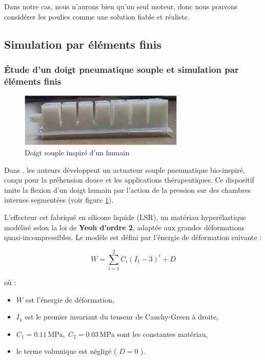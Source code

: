 \documentclass[a4paper, 11pt]{report}
\begin{document}
            Dans notre cas, nous n'aurons bien qu'un seul moteur, donc nous pouvons considérer les poulies comme une solution fiable et réaliste.

    \subsection{Simulation par éléments finis}

        \subsubsection{Étude d'un doigt pneumatique souple et simulation par éléments finis}

            \begin{figure}
                \centering
                \includegraphics[width=0.7\textwidth]{Figures/doigt_souple.jpg}
                \caption{Doigt souple inspiré d'un humain \cite{bhat_numerical_2025}}
                \label{fig:doigt_souple}
            \end{figure}

            Dans \cite{bhat_numerical_2025}, les auteurs développent un actuateur souple pneumatique bio-inspiré, conçu pour la préhension douce et les applications thérapeutiques. Ce dispositif imite la flexion d’un doigt humain par l'action de la pression sur des chambres internes segmentées (voir figure \ref{fig:doigt_souple}).

            L'effecteur est fabriqué en silicone liquide (LSR), un matériau hyperélastique modélisé selon la loi de \textbf{Yeoh d'ordre 2}, adaptée aux grandes déformations quasi-incompressibles. Le modèle est défini par l'énergie de déformation suivante :

            \[
            W = \sum_{i=1}^{2} C_i (I_1 - 3)^i + D
            \]

            où :
            \begin{itemize}
            \item \( W \) est l'énergie de déformation,
            \item \( I_1 \) est le premier invariant du tenseur de Cauchy-Green à droite,
            \item \( C_1 = 0.11\,\text{MPa},\; C_2 = 0.03\,\text{MPa} \) sont les constantes matériau,
            \item le terme volumique est négligé ( \( D = 0 \) ).
            \end{itemize}
\end{document}
